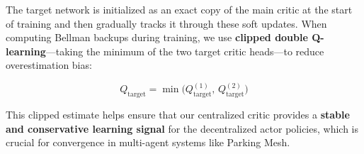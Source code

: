 The target network is initialized as an exact copy of the main critic at the start of training and then gradually tracks it through these soft updates. When computing Bellman backups during training, we use \textbf{clipped double Q-learning}—taking the minimum of the two target critic heads—to reduce overestimation bias:

\[
Q_{\text{target}} = \min\big(Q_{\text{target}}^{(1)},\, Q_{\text{target}}^{(2)}\big)
\]

This clipped estimate helps ensure that our centralized critic provides a \textbf{stable and conservative learning signal} for the decentralized actor policies, which is crucial for convergence in multi-agent systems like Parking Mesh.

​
